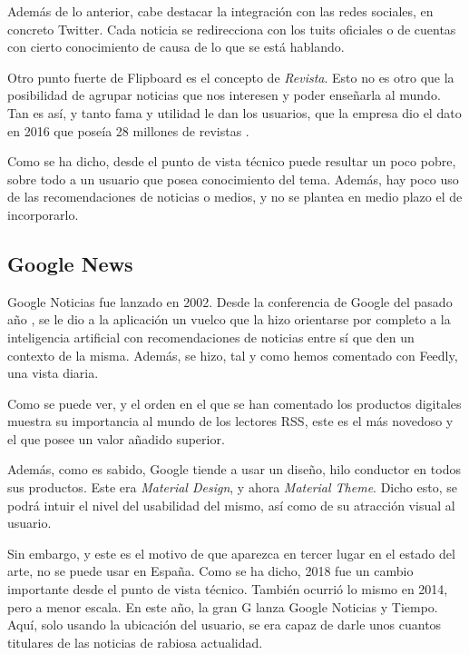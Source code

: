 Además de lo anterior, cabe destacar la integración con las redes sociales, en concreto Twitter. Cada noticia se redirecciona con los tuits oficiales o de cuentas con cierto conocimiento de causa de lo que se está hablando.

Otro punto fuerte de Flipboard es el concepto de \textit{Revista}. Esto no es otro que la posibilidad de agrupar noticias que nos interesen y poder enseñarla al mundo. Tan es así, y tanto fama y utilidad le dan los usuarios, que la empresa dio el dato en 2016 que poseía 28 millones de revistas .


Como se ha dicho, desde el punto de vista técnico puede resultar un poco pobre, sobre todo a un usuario que posea conocimiento del tema. Además, hay poco uso de las recomendaciones de noticias o medios, y no se plantea en medio plazo el de incorporarlo.

\subsection{Google News}

Google Noticias fue lanzado en 2002. Desde la conferencia de Google del pasado año , se le dio a la aplicación un vuelco que la hizo orientarse por completo a la inteligencia artificial con recomendaciones de noticias entre sí que den un contexto de la misma. Además, se hizo, tal y como hemos comentado con Feedly, una vista diaria.


Como se puede ver, y el orden en el que se han comentado los productos digitales muestra su importancia al mundo de los lectores RSS, este es el más novedoso y el que posee un valor añadido superior.

Además, como es sabido, Google tiende a usar un diseño, hilo conductor en todos sus productos. Este era \textit{Material Design}, y ahora \textit{Material Theme}. Dicho esto, se podrá intuir el nivel del usabilidad del mismo, así como de su atracción visual al usuario.

Sin embargo, y este es el motivo de que aparezca en tercer lugar en el estado del arte, no se puede usar en España. Como se ha dicho, 2018 fue un cambio importante desde el punto de vista técnico. También ocurrió lo mismo en 2014, pero a menor escala. En este año, la gran G lanza Google Noticias y Tiempo. Aquí, solo usando la ubicación del usuario, se era capaz de darle unos cuantos titulares de las noticias de rabiosa actualidad.

